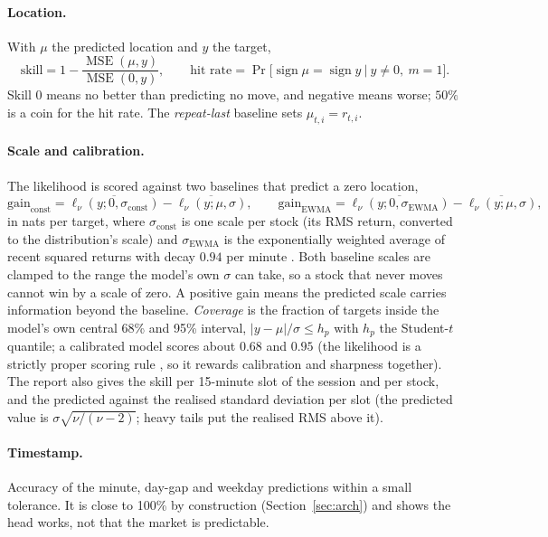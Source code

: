 \documentclass[11pt]{article}
\begin{document}
\paragraph{Location.} With $\mu$ the predicted location and $y$ the target,
\begin{equation}
  \text{skill}=1-\frac{\operatorname{MSE}(\mu,y)}{\operatorname{MSE}(0,y)},\qquad
  \text{hit rate}=\Pr\big[\operatorname{sign}\mu=\operatorname{sign}y\ \big|\ y\neq0,\ m=1\big].
\end{equation}
Skill $0$ means no better than predicting no move, and negative means worse; $50\%$ is a coin for the hit rate. The \emph{repeat-last} baseline sets $\mu_{t,i}=r_{t,i}$.

\paragraph{Scale and calibration.} The likelihood is scored against two baselines that predict a zero location,
\begin{equation}
  \text{gain}_{\text{const}}=\overline{\ell_\nu(y;0,\sigma_{\text{const}})}-\overline{\ell_\nu(y;\mu,\sigma)},\qquad
  \text{gain}_{\text{EWMA}}=\overline{\ell_\nu(y;0,\sigma_{\text{EWMA}})}-\overline{\ell_\nu(y;\mu,\sigma)},
\end{equation}
in nats per target, where $\sigma_{\text{const}}$ is one scale per stock (its RMS return, converted to the distribution's scale) and $\sigma_{\text{EWMA}}$ is the exponentially weighted average of recent squared returns with decay $0.94$ per minute
\citep{riskmetrics1996}. Both baseline scales are clamped to the range the model's own $\sigma$ can take, so a stock that never moves cannot win by a scale of zero. A positive gain means the predicted scale carries information beyond the baseline.
\emph{Coverage} is the fraction of targets inside the model's own central 68\% and 95\% interval, $|y-\mu|/\sigma\le h_p$ with $h_p$ the Student-$t$ quantile; a calibrated model scores about $0.68$ and $0.95$ (the likelihood is a strictly proper scoring rule
\citep{gneiting2007scoring}, so it rewards calibration and sharpness together).
The report also gives the skill per 15-minute slot of the session and per stock, and the predicted against the realised standard deviation per slot (the predicted value is $\sigma\sqrt{\nu/(\nu-2)}$; heavy tails put the realised RMS above it).

\paragraph{Timestamp.} Accuracy of the minute, day-gap and weekday predictions within a small tolerance. It is close to 100\% by construction (Section~\ref{sec:arch}) and shows the head works, not that the market is predictable.
\end{document}

